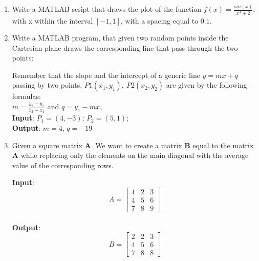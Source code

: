 \documentclass[oneside]{article}
\begin{document}
\begin{enumerate}
   \item Write a MATLAB script that draws the plot of the function
      $f(x)=\frac{sin(x)}{x^4 + 2}$, with x within the interval $\left[-1, 1 \right]$,
      with a spacing equal to $0.1$.

   \item Write a MATLAB program, that given two random points inside the Cartesian plane
      draws the corresponding line that pass through the two points:
      \begin{tcolorbox}[blanker, breakable, left=5mm, before skip=10pt, after skip=10pt,
         borderline west={1mm}{0pt}{bluepoli}]
         Remember that the slope and the intercept of a generic line $y=mx+q$ passing by
         two points, $P1(x_1, y_1),\:P2(x_2, y_2)$ are given by the following formulas:\\

         $m = \frac{y_2 - y_1}{x_2 - x_1}$ and $q = y_1 - mx_1$\\

         \textbf{Input}: $P_{1} = \left(4,-3\right)$; $P_{2} = \left(5,1\right)$;\\
         \textbf{Output}: $m = 4$, $q = -19$\\
      \end{tcolorbox}

   \item Given a square matrix \textbf{A}. We want to create a matrix \textbf{B} equal to
      the matrix \textbf{A} while replacing only the elements on the main diagonal with
      the average value of the corresponding rows.
      \begin{tcolorbox}[blanker, breakable, left=5mm, before skip=10pt, after skip=10pt,
         borderline west={1mm}{0pt}{bluepoli}]
         \textbf{Input}: \begin{equation*}
            A = \begin{bmatrix}
               1 & 2 & 3 \\
               4 & 5 & 6 \\
               7 & 8 & 9
            \end{bmatrix}
            \end{equation*}\\
         \textbf{Output}: \begin{equation*}
            B = \begin{bmatrix}
               2 & 2 & 3 \\
               4 & 5 & 6 \\
               7 & 8 & 8
            \end{bmatrix}
            \end{equation*}
      \end{tcolorbox}


\end{enumerate}
\end{document}
